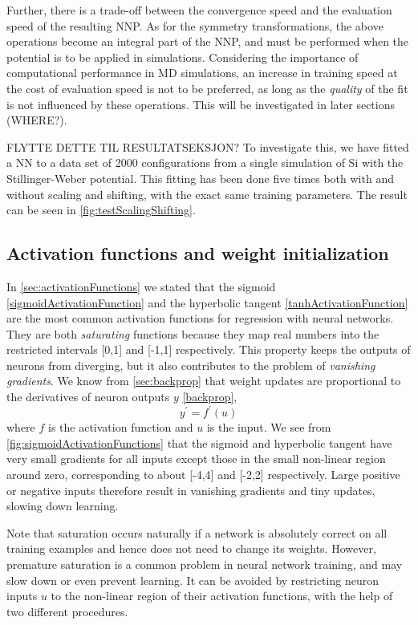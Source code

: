 \documentclass[twoside,english]{uiofysmaster}
\begin{document}
Further, there is a trade-off between the convergence speed and the evaluation speed of the resulting NNP. 
As for the symmetry transformations, the above operations become an integral part of the NNP, and must be performed 
when the potential is to be applied in simulations. Considering the importance of computational performance in MD simulations,
an increase in training speed at the cost of evaluation speed is not to be preferred, as long as the \textit{quality} of the fit 
is not influenced by these operations. This will be investigated in later sections (WHERE?). 

FLYTTE DETTE TIL RESULTATSEKSJON? To investigate this, we have fitted a NN to a data set of 2000 configurations
from a single simulation of Si with the Stillinger-Weber potential. This fitting has been done five times both with and without 
scaling and shifting, with the exact same training parameters. The result can be seen in \autoref{fig:testScalingShifting}. 



\subsection{Activation functions and weight initialization} \label{sec:hyperParamsActFunctions}
In \autoref{sec:activationFunctions} we stated that the sigmoid \eqref{sigmoidActivationFunction} and 
the hyperbolic tangent \eqref{tanhActivationFunction} are the most common activation functions for regression
with neural networks. They are both \textit{saturating} functions because they map real numbers into the restricted intervals 
[0,1] and [-1,1] respectively. This property keeps the outputs of neurons from diverging, but it also contributes to 
the problem of \textit{vanishing gradients}. We know from \autoref{sec:backprop} that
weight updates are proportional to the derivatives of neuron outputs $y$ \eqref{backprop},
\begin{equation}
 y^\prime = f^\prime(u)
\end{equation}
where $f$ is the activation function and $u$ is the input. 
We see from \autoref{fig:sigmoidActivationFunctions} that the sigmoid and hyperbolic
tangent have very small gradients for all inputs except those in the small non-linear region around zero, corresponding 
to about [-4,4] and [-2,2] respectively. 
Large positive or negative inputs therefore result in vanishing gradients and tiny updates, slowing down learning. 

Note that saturation occurs naturally if a network is absolutely correct on all training examples and 
hence does not need to change its weights. However, premature saturation is a common problem in neural network training, and may slow
down or even prevent learning. It can be avoided by restricting neuron inputs $u$ to the non-linear region of their 
activation functions, with the help of two different procedures. 
\end{document}
